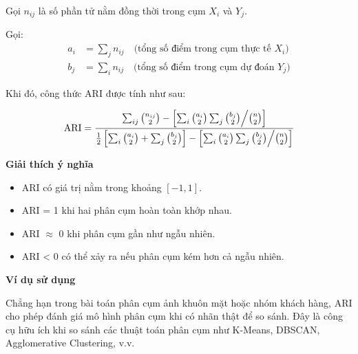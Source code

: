 Gọi $n_{ij}$ là số phần tử nằm đồng thời trong cụm $X_i$ và $Y_j$.

Gọi:
\begin{align*}
a_i &= \sum_{j} n_{ij} \quad \text{(tổng số điểm trong cụm thực tế $X_i$)} \\
b_j &= \sum_{i} n_{ij} \quad \text{(tổng số điểm trong cụm dự đoán $Y_j$)}
\end{align*}

Khi đó, công thức ARI được tính như sau:

\begin{equation}
\text{ARI} = \frac{
    \sum_{ij} \binom{n_{ij}}{2}
    - \left[ \sum_i \binom{a_i}{2} \sum_j \binom{b_j}{2} \middle/ \binom{n}{2} \right]
}{
    \frac{1}{2} \left[ \sum_i \binom{a_i}{2} + \sum_j \binom{b_j}{2} \right]
    - \left[ \sum_i \binom{a_i}{2} \sum_j \binom{b_j}{2} \middle/ \binom{n}{2} \right]
}
\end{equation}

\textbf{Giải thích ý nghĩa}

\begin{itemize}
    \item ARI có giá trị nằm trong khoảng $[-1, 1]$.
    \item ARI = 1 khi hai phân cụm hoàn toàn khớp nhau.
    \item ARI $\approx$ 0 khi phân cụm gần như ngẫu nhiên.
    \item ARI < 0 có thể xảy ra nếu phân cụm kém hơn cả ngẫu nhiên.
\end{itemize}

\textbf{Ví dụ sử dụng}

Chẳng hạn trong bài toán phân cụm ảnh khuôn mặt hoặc nhóm khách hàng, ARI cho phép đánh giá mô hình phân cụm khi có nhãn thật để so sánh. Đây là công cụ hữu ích khi so sánh các thuật toán phân cụm như K-Means, DBSCAN, Agglomerative Clustering, v.v.
